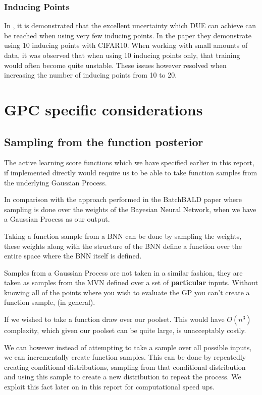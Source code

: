 \documentclass[12pt, a4paper]{report}
\theoremstyle{definition}
\theoremstyle{definition}
\theoremstyle{definition}
\begin{document}
\subsection{Inducing Points}

In \cite{vanamersfoort2020uncertainty}, it is demonstrated that the excellent uncertainty which DUE can achieve can be reached when using very few inducing points. In the paper they demonstrate using 10 inducing points with CIFAR10. When working with small amounts of data, it was observed that when using 10 inducing points only, that training would often become quite unstable. These issues however resolved when increasing the number of inducing points from 10 to 20.





\chapter{GPC specific considerations}
\label{Chap5}



\section{Sampling from the function posterior}

The active learning score functions which we have specified earlier in this report, if implemented directly would require us to be able to take function samples from the underlying Gaussian Process.

In comparison with the approach performed in the BatchBALD paper where sampling is done over the weights of the Bayesian Neural Network, when we have a Gaussian Process as our output.

Taking a function sample from a BNN can be done by sampling the weights, these weights along with the structure of the BNN define a function over the entire space where the BNN itself is defined.

Samples from a Gaussian Process are not taken in a similar fashion, they are taken as samples from the MVN defined over a set of \textbf{particular} inputs. Without knowing all of the points where you wish to evaluate the GP you can't create a function sample, (in general). 

If we wished to take a function draw over our poolset. This would have $O(n^3)$ complexity, which given our poolset can be quite large, is unacceptably costly. 

We can however instead of attempting to take a sample over all possible inputs, we can incrementally create function samples. This can be done by repeatedly creating conditional distributions, sampling from that conditional distribution and using this sample to create a new distribution to repeat the process. We exploit this fact later on in this report for computational speed ups.
\end{document}
